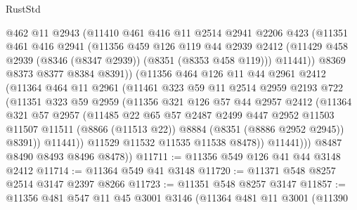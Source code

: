 \begin{lexlean}{RustStd}
\begin{coremodule}
              @462
              @11
              @2943
              (@11410
                @461
                @416
                @11
                @2514
                @2941
                @2206
                @423
                (@11351
                  @461
                  @416
                  @2941
                  (@11356
                    @459
                    @126
                    @119
                    @44
                    @2939
                    @2412
                    (@11429 @458 @2939 (@8346 (@8347 @2939)) (@8351 (@8353 @458 @119)))
                    @11441))
                @8369
                @8373
                @8377
                @8384
                @8391))
            (@11356
              @464
              @126
              @11
              @44
              @2961
              @2412
              (@11364
                @464
                @11
                @2961
                (@11461
                  @323
                  @59
                  @11
                  @2514
                  @2959
                  @2193
                  @722
                  (@11351
                    @323
                    @59
                    @2959
                    (@11356
                      @321
                      @126
                      @57
                      @44
                      @2957
                      @2412
                      (@11364
                        @321
                        @57
                        @2957
                        (@11485
                          @22
                          @65
                          @57
                          @2487
                          @2499
                          @447
                          @2952
                          @11503
                          @11507
                          @11511
                          (@8866 (@11513 @22))
                          @8884
                          (@8351 (@8886 @2952 @2945))
                          @8391))
                      @11441))
                  @11529
                  @11532
                  @11535
                  @11538
                  @8478))
              @11441)))
        @8487
        @8490
        @8493
        @8496
        @8478))
@11711 := @11356 @549 @126 @41 @44 @3148 @2412
@11714 := @11364 @549 @41 @3148
@11720 := @11371 @548 @8257 @2514 @3147 @2397 @8266
@11723 := @11351 @548 @8257 @3147
@11857 := @11356
    @481
    @547
    @11
    @45
    @3001
    @3146
    (@11364
      @481
      @11
      @3001
      (@11390

\end{coremodule}
\end{lexlean}
